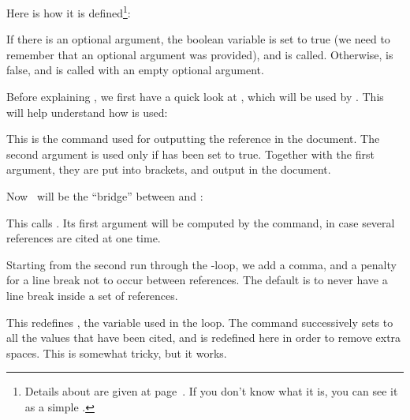 Here is how it is defined\footnote{Details about
   are given at page~\pageref{DRC}. If you
  don't know what it is, you can see it as a simple
  .}: 
%
\begin{listing}{1}
\DeclareRobustCommand\cite{%
  \@ifnextchar [{\@tempswatrue\@citex}{\@tempswafalse\@citex[]}}
\end{listing}
% 
If there is an optional argument, the boolean variable 
is set to true (we need to remember that an optional argument was provided), 
and   is called. Otherwise,  is false, and
 is called with an empty optional argument.


Before explaining , we first have a quick look at
, which will be used by . This will help 
understand how  is used: 
%
\begin{listing}{1}
\def\@cite#1#2{[{#1\if@tempswa , #2\fi}]}
\end{listing}
This is the command used for outputting the reference in the
document. The second argument is used only if  has been
set to true. Together with the first argument, they are put into
brackets, and output in the document.

Now ~will be the ``bridge'' between  and :
\label{citex}
%
\begin{listing}{1}
\def\@citex[#1]#2{%
  \let\@citea\@empty
  \@cite{\@for\@citeb:=#2\do
\end{listing}

This calls . Its first argument will be computed by the
 command, in case several references are cited at one
time.
%
\begin{listingcont}
    {\@citea\def\@citea{,\penalty\@m\ }%
\end{listingcont}
%
Starting from the second run through the -loop, we add a
comma, and a penalty for a line break not to occur between references.
The default is to never have a line break inside a set of references.
%
\begin{listingcont}
     \edef\@citeb{\expandafter\@firstofone\@citeb\@empty}%
\end{listingcont}
%
This redefines , the variable used in the loop. The
 command successively sets  to all the values
that have been cited, and  is redefined here in order to
remove extra spaces. This is somewhat tricky, but it works.
\label{citation}

